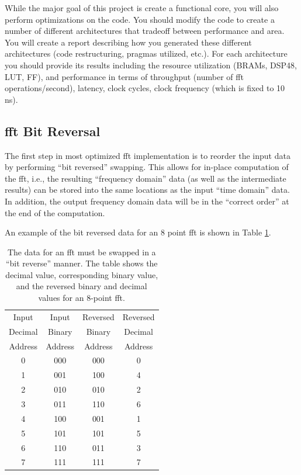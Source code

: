 While the major goal of this project is create a functional core, you will also perform optimizations on the code. You should modify the code to create a number of different architectures that tradeoff between performance and area. You will create a report describing how you generated these different architectures (code restructuring, pragmas utilized, etc.). For each architecture you should provide its results including the resource utilization (BRAMs, DSP48, LUT, FF), and performance in terms of throughput (number of \gls{fft} operations/second), latency, clock cycles, clock frequency (which is fixed to 10 ns).

\subsection{\gls{fft} Bit Reversal}
The first step in most optimized \gls{fft} implementation is to reorder the input data by performing ``bit reversed'' swapping. This allows for in-place computation of the \gls{fft}, i.e., the resulting ``frequency domain'' data (as well as the intermediate results) can be stored into the same locations as the input ``time domain'' data. In addition, the output frequency domain data will be in the ``correct order'' at the end of the computation.

An example of the bit reversed data for an 8 point \gls{fft} is shown in Table \ref{tab:bit_reverse}.
\begin{table}[htbp]
\caption{The data for an \gls{fft} must be swapped in a ``bit reverse'' manner. The table shows the decimal value, corresponding binary value, and the reversed binary and decimal values for an 8-point \gls{fft}. }
\begin{center}
\begin{tabular}{|c|c|c|c|}
\hline
Input & Input  & Reversed  & Reversed  \\
Decimal & Binary & Binary & Decimal \\
Address & Address & Address & Address \\
\hline
0 & 000 & 000 & 0 \\
\hline
1	& 001 &	100	& 4 \\
\hline
2	& 010	& 010	& 2 \\
\hline
3	& 011	& 110	& 6 \\ 
\hline
4	& 100	& 001	& 1 \\
\hline
5	& 101	& 101	& 5 \\
\hline
6	& 110	& 011	& 3 \\
\hline
7	& 111	& 111	& 7 \\
\hline
\end{tabular}
\end{center}
\label{tab:bit_reverse}
\end{table}%


